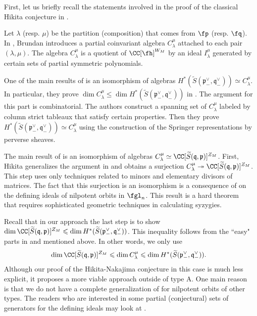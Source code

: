 \documentclass[12pt]{amsart}
\begin{document}
First, let us briefly recall the statements involved in the proof of the classical Hikita conjecture in \cite[Appendix A]{Hikita}. 

Let $\lambda$ (resp. $\mu$) be the partition (composition) that comes from $\fp$ (resp. $\fq$). In \cite{Brundan2008}, Brundan introduces a partial coinvariant algebra $C^{\mu}_{\lambda}$ attached to each pair $(\lambda, \mu)$. The algebra $C^{\mu}_{\lambda}$ is a quotient of $\CC[\fh]^{W_M}$ by an ideal $I_{\lambda}^{\mu}$ generated by certain sets of partial symmetric polynomials. 

One of the main results of \cite{bo} is an isomorphism of algebras $H^*(\widetilde{S}(\mathfrak{p}^\vee_-,\mathfrak{q}^\vee_-))\simeq C^{\mu}_{\lambda}$. In particular, they prove $\dim C^{\mu}_{\lambda}\leqslant \dim H^*(\widetilde{S}(\mathfrak{p}^\vee_-,\mathfrak{q}^\vee_-))$ in \cite[Sections 2,3]{bo}. The argument for this part is combinatorial. The authors construct a spanning set of $C^{\mu}_{\lambda}$ labeled by column strict tableaux that satisfy certain properties. Then they prove $H^*(\widetilde{S}(\mathfrak{p}^\vee_-,\mathfrak{q}^\vee_-))\simeq C^{\mu}_{\lambda}$ using the construction of the Springer representations by perverse sheaves.

The main result of \cite[Appendix A]{Hikita} is an isomorphism of algebras $C_{\lambda}^{\mu}\simeq \CC[\widetilde{S}(\mathfrak{q},\mathfrak{p})]^{Z_M}$. First, Hikita generalizes the argument in \cite[Lemma 1]{Tanisaki} and obtains a surjection $C_{\lambda}^{\mu}\twoheadrightarrow  \CC[\widetilde{S}(\mathfrak{q},\mathfrak{p})]^{Z_M}$. This step uses only techniques related to minors and elementary divisors of matrices. The fact that this surjection is an isomorphism is a consequence of \cite[Theorem 4.6]{Weyman} on the defining ideals of nilpotent orbits in $\fgl_n$. This result is a hard theorem that requires sophisticated geometric techniques in calculating syzygies. 

Recall that in our approach the last step is to show $\dim \CC[\widetilde{S}(\mathfrak{q},\mathfrak{p})]^{Z_M}\leqslant \dim H^*(\widetilde{S}(\mathfrak{p}^\vee_-,\mathfrak{q}^\vee_-))$. This inequality follows from the  ``easy" parts in \cite{bo} and \cite{Hikita} mentioned above. In other words, we only use
$$\dim \CC[\widetilde{S}(\mathfrak{q},\mathfrak{p})]^{Z_M} \leqslant \dim C_\lambda^{\mu} \leqslant \dim H^*(\widetilde{S}(\mathfrak{p}^\vee_-,\mathfrak{q}^\vee_-)).$$
Although our proof of the Hikita-Nakajima conjecture in this case is much less explicit, it proposes a more viable approach outside of type A. One main reason is that we do not have a complete generalization of \cite[Theorem 4.6]{Weyman} for nilpotent orbits of other types. The readers who are interested in some partial (conjectural) sets of generators for the defining ideals may look at \cite[Section 8.3]{Weymanbook}.
\end{document}
